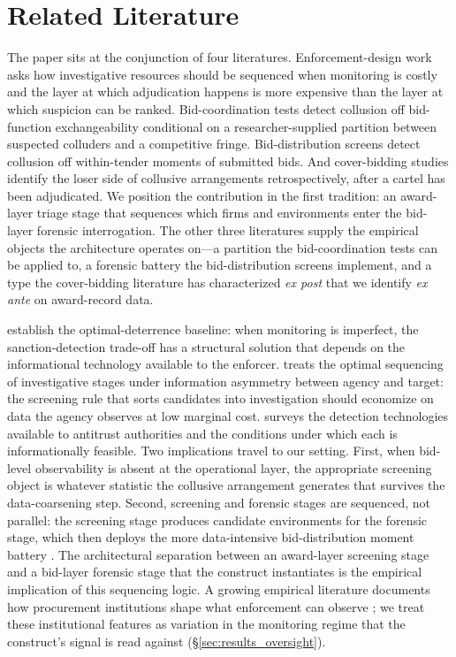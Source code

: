 \section{Related Literature}
\label{sec:literature}

The paper sits at the conjunction of four literatures.
Enforcement-design work asks how investigative resources should
be sequenced when monitoring is costly and the layer at which
adjudication happens is more expensive than the layer at which
suspicion can be ranked. Bid-coordination tests detect collusion
off bid-function exchangeability conditional on a
researcher-supplied partition between suspected colluders and a
competitive fringe. Bid-distribution screens detect collusion
off within-tender moments of submitted bids. And cover-bidding
studies identify the loser side of collusive arrangements
retrospectively, after a cartel has been adjudicated. We
position the contribution in the first tradition: an award-layer
triage stage that sequences which firms and environments enter
the bid-layer forensic interrogation. The other three
literatures supply the empirical objects the architecture
operates on---a partition the bid-coordination tests can be
applied to, a forensic battery the bid-distribution screens
implement, and a type the cover-bidding literature has
characterized \emph{ex post} that we identify \emph{ex ante}
on award-record data.

\citet{becker1968crime,stigler1970optimum} establish the
optimal-deterrence baseline: when monitoring is imperfect, the
sanction-detection trade-off has a structural solution that
depends on the informational technology available to the
enforcer. \citet{baker2002case} treats the optimal sequencing of
investigative stages under information asymmetry between agency
and target: the screening rule that sorts candidates into
investigation should economize on data the agency observes at
low marginal cost. \citet{harrington2008detecting} surveys the
detection technologies available to antitrust authorities and
the conditions under which each is informationally feasible.
Two implications travel to our setting. First, when bid-level
observability is absent at the operational layer, the
appropriate screening object is whatever statistic the
collusive arrangement generates that survives the
data-coarsening step. Second, screening and forensic stages are
sequenced, not parallel: the screening stage produces candidate
environments for the forensic stage, which then deploys the
more data-intensive bid-distribution moment battery
\citep{chassang2022robust}. The architectural separation
between an award-layer screening stage and a bid-layer forensic
stage that the construct instantiates is the empirical
implication of this sequencing logic. A growing empirical
literature documents how procurement institutions shape what
enforcement can observe
\citep{coviello2017tenure,decarolis2020bureaucratic,decarolis2020rules};
we treat these institutional features as variation in the
monitoring regime that the construct's signal is read against
(\S\ref{sec:results_oversight}).

